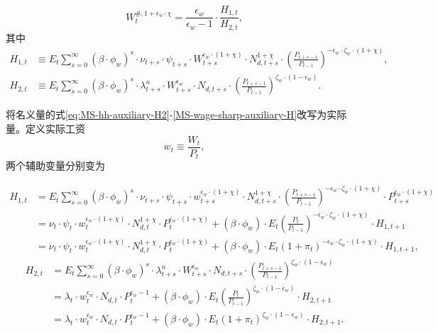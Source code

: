 \begin{equation}
\label{MS-wage-sharp-auxiliary-H}
W_t^{\#, 1+\epsilon_w \cdot \chi} = \frac{\epsilon_w}{\epsilon_w - 1} \cdot \frac{H_{1,t}}{H_{2,t}},
\end{equation}
其中
\begin{align}
\label{eq:MS-hh-auxiliary-H1}
H_{1,t} &\equiv E_t \sum_{s=0}^{\infty} \left(\beta \cdot \phi_w\right)^s \cdot  \nu_{t+s} \cdot \psi_{t+s} \cdot W_{t+s}^{\epsilon_w \cdot (1+\chi)} \cdot N_{d,t+s}^{1+\chi} \cdot \left(\frac{P_{t+s-1}}{P_{t-1}}\right)^{-\epsilon_w \cdot \zeta_w \cdot (1+\chi)}, \\
\label{eq:MS-hh-auxiliary-H2}
H_{2,t} &\equiv E_t \sum_{s=0}^{\infty} \left(\beta \cdot \phi_w\right)^s \cdot  \lambda^n_{t+s} \cdot W_{t+s}^{\epsilon_w} \cdot N_{d,t+s} \cdot \left(\frac{P_{t+s-1}}{P_{t-1}}\right)^{\zeta_w \cdot (1-\epsilon_w)}.
\end{align}

将名义量的式\eqref{eq:MS-hh-auxiliary-H2}-\eqref{MS-wage-sharp-auxiliary-H}改写为实际量。定义实际工资
\begin{equation}
\label{MS-hh-real-wage}
w_t \equiv \frac{W_t}{P_t},
\end{equation}
两个辅助变量分别变为

\begin{align}
H_{1,t} &= E_t \sum_{s=0}^{\infty} \left(\beta \cdot \phi_w \right)^s \cdot  \nu_{t+s} \cdot \psi_{t+s} \cdot w_{t+s}^{\epsilon_w \cdot (1+\chi)} \cdot N_{d,t+s}^{1+\chi} \cdot \left(\frac{P_{t+s-1}}{P_{t-1}}\right)^{-\epsilon_w \cdot \zeta_w \cdot (1+\chi)} \cdot P_{t+s}^{\epsilon_w \cdot \left(1+\chi\right)} \nonumber \\
& = \nu_t \cdot \psi_t \cdot w_t^{\epsilon_w \cdot \left(1+\chi \right)} \cdot N_{d,t}^{1+\chi} \cdot P_t^{\epsilon_w \cdot \left(1+\chi\right)}+ \left(\beta \cdot \phi_w \right) \cdot E_t \left(\frac{P_t}{P_{t-1}}\right)^{-\epsilon_w \cdot \zeta_w \cdot (1+\chi)} \cdot H_{1,t+1} \nonumber \\
\label{eq:MS-hh-auxiliary-H1-real}
&=\nu_t \cdot \psi_t \cdot w_t^{\epsilon_w \cdot \left(1+\chi \right)} \cdot N_{d,t}^{1+\chi} \cdot P_t^{\epsilon_w \cdot \left(1+\chi\right)}+ \left(\beta \cdot \phi_w \right) \cdot E_t \left( 1+\pi_t \right)^{-\epsilon_w \cdot \zeta_w \cdot (1+\chi)} \cdot H_{1,t+1},
\end{align}
\begin{align}
H_{2,t} &= E_t \sum_{s=0}^{\infty} \left(\beta \cdot \phi_w\right)^s \cdot  \lambda^n_{t+s} \cdot W_{t+s}^{\epsilon_w} \cdot N_{d,t+s} \cdot \left(\frac{P_{t+s-1}}{P_{t-1}}\right)^{\zeta_w \cdot (1-\epsilon_w)} \nonumber \\
&= \lambda_t \cdot w_t^{\epsilon_w} \cdot N_{d,t} \cdot P_t^{\epsilon_w -1} + \left(\beta \cdot \phi_w \right) \cdot E_t \left(\frac{P_t}{P_{t-1}}\right)^{\zeta_w \cdot (1-\epsilon_w)} \cdot H_{2,t+1} \nonumber \\
\label{eq:MS-hh-auxiliary-H2-real}
&= \lambda_t \cdot w_t^{\epsilon_w} \cdot N_{d,t} \cdot P_t^{\epsilon_w -1} + \left(\beta \cdot \phi_w \right) \cdot E_t \left( 1+\pi_t \right)^{\zeta_w \cdot (1-\epsilon_w)} \cdot H_{2,t+1}.
\end{align}

